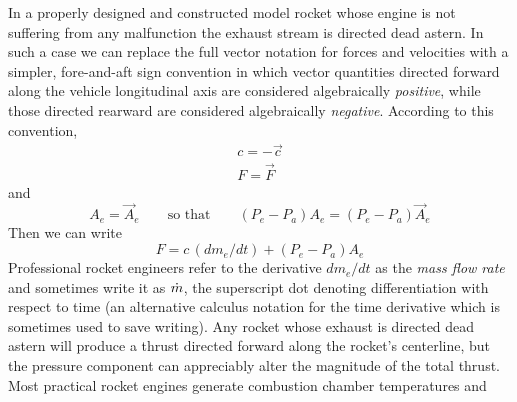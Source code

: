 In a properly designed and constructed model rocket whose engine is not suffering from any
malfunction the exhaust stream is directed dead astern. In such a case we can replace the full
vector notation for forces and velocities with a simpler, fore-and-aft sign convention in which
vector quantities directed forward along the vehicle longitudinal axis are considered
algebraically \emph{positive}, while those directed rearward are considered algebraically
\emph{negative}. According to this convention,
\begin{gather*}
c = -\vec{c}\\
F = \vec{F}
\end{gather*}
and
\begin{equation*}
A_e = \vec{A}_e \qquad\text{so that}\qquad (P_e - P_a)A_e = (P_e - P_a)\vec{A}_e
\end{equation*}
Then we can write
\begin{equation}\label{ch1:eq:2}
F = c\,(dm_e/dt) + (P_e - P_a)A_e
\end{equation}
Professional rocket engineers refer to the derivative $dm_e/dt$ as the \emph{mass flow rate} and
sometimes write it as $\dot{m}$, the superscript dot denoting differentiation with respect to time
(an alternative calculus notation for the time derivative which is sometimes used to save
writing). Any rocket whose exhaust is directed dead astern will produce a thrust directed forward
along the rocket's centerline, but the pressure component can appreciably alter the magnitude of
the total thrust. Most practical rocket engines generate combustion chamber temperatures and
